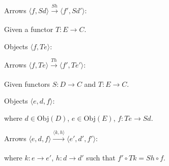 \begin{figure}[H]
\centering

\end{figure}

\noindent Arrows $\langle f,Sd \rangle \xrightarrow[]{Sh} \langle f',Sd' \rangle$:

\begin{figure}[H]
\centering

\end{figure}

\label{objectsoverfunctor}

Given a functor $T:E \rightarrow C$.\newline

\noindent Objects $\langle f,Te \rangle$:

\begin{figure}[H]
\centering

\end{figure}

\noindent Arrows $\langle f,Te \rangle \xrightarrow[]{Th} \langle f',Te' \rangle$:

\begin{figure}[H]
\centering

\end{figure}

\label{commacategory}

Given functors $S:D \rightarrow C$ and $T:E \rightarrow C$.\newline

\noindent Objects $\langle e,d,f \rangle$:

\begin{figure}[H]
\centering

\end{figure}

\noindent where $d \in$Obj$(D)$, $e \in$Obj$(E)$, $f:Te \rightarrow Sd$.\newline

\noindent Arrows $\langle e,d,f \rangle \xrightarrow[]{\langle k,h \rangle} \langle e',d',f' \rangle$:

\begin{figure}[H]
\centering

\end{figure}

\noindent where $k:e \rightarrow e'$, $h:d \rightarrow d'$ such that $f' \circ Tk = Sh \circ f$.\newline

